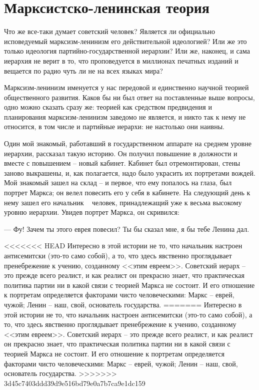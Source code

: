 \documentclass{book}
\begin{document}
\section{Марксистско-ленинская теория}


Что же все-таки думает советский человек? Является ли официально исповедуемый марксизм-ленинизм его действи­тельной идеологией? Или же это только идеология партийно-государственной иерархии? Или же, наконец, и сама иерархия не верит в то, что проповедуется в миллионах печатных изда­ний и вещается по радио чуть ли не на всех языках мира?

Марксизм-ленинизм именуется у нас передовой и единствен­но научной теорией  общественного развития. Каков бы ни был ответ на поставленные выше вопросы, одно можно сказать сразу же: теорией как средством предвидения и планирования марксизм-ленинизм заведомо не является, и никто так к нему не относится, в том числе и партийные иерархи: не настолько они наивны.

Один мой знакомый, работавший в государственном аппа­рате на среднем уровне иерархии, рассказал такую историю. Он получил повышение в должности и вместе с повышением -- новый кабинет. Кабинет был отремонтирован, стены заново выкрашены, и, как полагается, надо было украсить их порт­ретами вождей. Мой знакомый зашел на склад -- и первое, что ему попалось на глаза, был портрет Маркса; он велел пове­сить его у себя в кабинете. На следующий день к нему зашел его начальник ~ человек, принадлежащий уже к весьма высо­кому уровню иерархии. Увидев портрет Маркса, он скривился:

--- Фу! Зачем ты этого еврея повесил? Ты бы сказал мне, я бы тебе Ленина дал.

<<<<<<< HEAD
Интересно в этой истории не то, что начальник настроен антисемитски (это‑то само собой), а то, что здесь явственно проглядывает пренебрежение к учению, созданному <<этим евреем>>. Советский иерарх -- это прежде всего реалист, и как реалист он прекрасно знает, что практическая политика партии ни в какой связи с теорией Маркса не состоит. И его отношение к портретам определяется факторами чисто человеческими: Маркс -- еврей, чужой; Ленин -- наш, свой, основатель государства.
=======
Интересно в этой истории не то, что начальник настроен антисемитски (это-то само собой), а то, что здесь явственно проглядывает пренебрежение к учению, созданному <<этим евреем>>. Советский иерарх -- это прежде всего реалист, и как реалист он прекрасно знает, что практическая политика партии ни в какой связи с теорией Маркса не состоит. И его отношение к портретам определяется факторами чисто человеческими: Маркс -- еврей, чужой; Ленин -- наш, свой, основатель государства.
>>>>>>> 3d45c7403ddd39d9e516bd79e0a7b7ca9e1dc159
\end{document}
